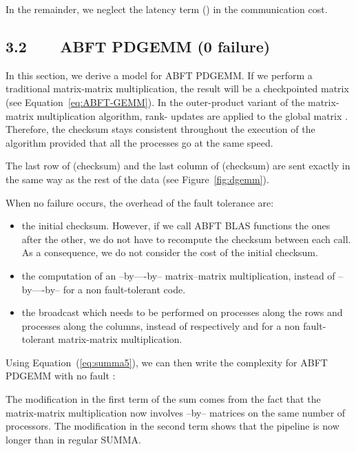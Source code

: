 \documentclass[pdftex,11pt]{article}
\begin{document}
In the remainder, we neglect the latency term () in the
communication cost.

\subsection*{\color{DodgerBlue4}3.2~~~~ABFT PDGEMM (0 failure)}

In this section, we derive a model for ABFT PDGEMM.  If we perform a
traditional matrix-matrix multiplication, the result will be a
checkpointed matrix (see Equation~\ref{eq:ABFT-GEMM}). In the
outer-product variant of the matrix-matrix multiplication algorithm,
rank- updates are applied to the global matrix . Therefore, the
checksum stays consistent throughout the execution of the algorithm
provided that all the processes go at the same speed.

The last row of  (checksum) and the last column of  (checksum)
are sent exactly in the same way as the rest of the data (see
Figure~\ref{fig:dgemm}).

When no failure occurs, the overhead of the fault tolerance are:
\begin{itemize}

\item the initial checksum. However, if we call ABFT BLAS functions
  the ones after the other, we do not have to recompute the checksum
  between each call. As a consequence, we do not consider the cost of
  the initial checksum.

\item the computation of an --by----by--
  matrix--matrix multiplication, instead of --by----by-- for
  a non fault-tolerant code.

\item the broadcast which needs to be performed on  processes
  along the rows and  processes along the columns, instead of
  respectively  and  for a non fault-tolerant matrix-matrix
  multiplication.

\end{itemize}

Using Equation~(\ref{eq:summa5}), we can then write the complexity for
ABFT PDGEMM with no fault :



The modification in the first term of the sum comes from the fact that
the matrix-matrix multiplication now involves --by--
matrices on the same number of processors. The modification in the
second term shows that the pipeline is now longer than in regular
SUMMA.
\end{document}
